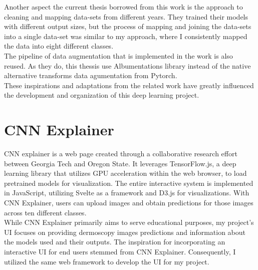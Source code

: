 Another aspect the current thesis borrowed from this work is the approach to cleaning and mapping data-sets from different years. They trained their models with different output sizes, but the process of mapping and joining the data-sets into a single data-set was similar to my approach, where I consistently mapped the data into eight different classes. \\

The pipeline of data augmentation that is implemented in the work is also reused. As they do, this thessis use Albumentations\cite{Albumentations} library instead of the native alternative transforms data agumentation from Pytorch. \\

These inspirations and adaptations from the related work have greatly influenced the development and organization of this deep learning project.

\section{CNN Explainer}

CNN explainer is a web page created through a collaborative research effort between Georgia Tech and Oregon State\cite{CNNExplainer}. It leverages TensorFlow.js, a deep learning library that utilizes GPU acceleration within the web browser, to load pretrained models for visualization. The entire interactive system is implemented in JavaScript, utilizing Svelte as a framework and D3.js for visualizations. With CNN Explainer, users can upload images and obtain predictions for those images across ten different classes. \\

While CNN Explainer primarily aims to serve educational purposes, my project's UI focuses on providing dermoscopy images predictions and information about the models used and their outputs. The inspiration for incorporating an interactive UI for end users stemmed from CNN Explainer. Consequently, I utilized the same web framework to develop the UI for my project.









